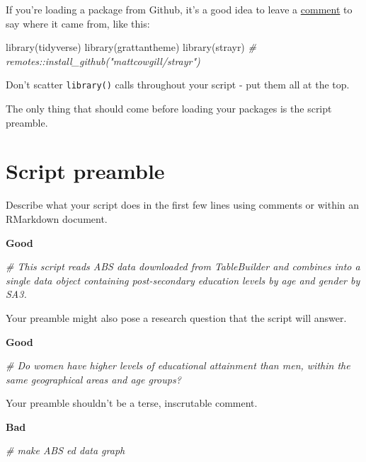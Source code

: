 \documentclass[
]{book}
\newenvironment{Shaded}{\begin{snugshade}}{\end{snugshade}}
\newcommand{\CommentTok}[1]{\textcolor[rgb]{0.56,0.35,0.01}{\textit{#1}}}
\newcommand{\FunctionTok}[1]{\textcolor[rgb]{0.00,0.00,0.00}{#1}}
\newcommand{\NormalTok}[1]{#1}
\begin{document}
If you're loading a package from Github, it's a good idea to leave a \protect\hyperlink{use-comments}{comment} to say where it came from, like this:

\begin{Shaded}
\begin{Highlighting}[]
\FunctionTok{library}\NormalTok{(tidyverse)}
\FunctionTok{library}\NormalTok{(grattantheme)}
\FunctionTok{library}\NormalTok{(strayr) }\CommentTok{\# remotes::install\_github("mattcowgill/strayr")}
\end{Highlighting}
\end{Shaded}

Don't scatter \texttt{library()} calls throughout your script - put them all at the top.

The only thing that should come before loading your packages is the script preamble.

\hypertarget{script-preamble}{%
\section{Script preamble}\label{script-preamble}}

Describe what your script does in the first few lines using comments or within an RMarkdown document.

\textbf{Good}

\begin{Shaded}
\begin{Highlighting}[]
\CommentTok{\# This script reads ABS data downloaded from TableBuilder and combines into a single data object containing post{-}secondary education levels by age and gender by SA3. }
\end{Highlighting}
\end{Shaded}

Your preamble might also pose a research question that the script will answer.

\textbf{Good}

\begin{Shaded}
\begin{Highlighting}[]
\CommentTok{\# Do women have higher levels of educational attainment than men, within the same geographical areas and age groups?}
\end{Highlighting}
\end{Shaded}

Your preamble shouldn't be a terse, inscrutable comment.

\textbf{Bad}

\begin{Shaded}
\begin{Highlighting}[]
\CommentTok{\# make ABS ed data graph}
\end{Highlighting}
\end{Shaded}
\end{document}

